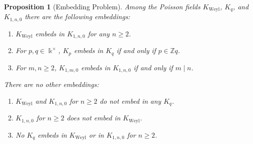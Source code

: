 \documentclass[12pt]{amsart}
\theoremstyle{plain}
\newtheorem{proposition}[theorem]{Proposition}
\numberwithin{theorem}{section}
\numberwithin{equation}{theorem}
\theoremstyle{definition}
\newcommand{\ZZ}{\mathbb{Z}}
\DeclareMathOperator{\Weyl}{Weyl}
\newcommand \Kweyl {K_{\Weyl}}
\newcommand \kx {\Bbbk^\times}
\begin{document}
\begin{proposition}[Embedding Problem]  \label{zzpro4.10}
Among the Poisson fields $\Kweyl$, $K_q$, and $K_{1,n,0}$ there are the following embeddings:
\begin{enumerate}
\item[(1)]
$\Kweyl$ embeds in $K_{1,n,0}$ for any $n \ge 2$.
\item[(2)] 
For $p,q \in \kx$, $K_p$ embeds in $K_q$ if and only if $p \in \ZZ q$.
\item[(3)]
For $m,n \ge 2$, $K_{1,m,0}$ embeds in $K_{1,n,0}$ if and only if $m \mid n$.
\end{enumerate}
There are no other embeddings:
\begin{enumerate}
\item[(4)] 
$\Kweyl$ and $K_{1,n,0}$ for $n \ge 2$ do not embed in any $K_q$.
\item[(5)]
$K_{1,n,0}$ for $n \ge 2$ does not embed in $\Kweyl$.
\item[(6)]
No $K_q$ embeds in $\Kweyl$ or in $K_{1,n,0}$ for $n \ge 2$.
\end{enumerate}
\end{proposition}
\end{document}
